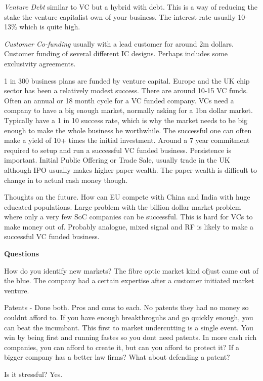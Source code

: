 \textit{Venture Debt} similar to VC but a hybrid with debt. This is a way of reducing the stake the venture capitalist own of your business. The interest rate usually 10-13\% which is quite high.

\textit{Customer Co-funding} usually with a lead customer for around 2m dollars. Customer funding of several different IC designs. Perhaps includes some exclusivity agreements.

1 in 300 business plans are funded by venture capital. Europe and the UK chip sector has been a relatively modest success. There are around 10-15 VC funds. Often an annual or 18 month cycle for a VC funded company. VCs need a company to have a big enough market, normally asking for a 1bn dollar market. Typically have a 1 in 10 success rate, which is why the market needs to be big enough to make the whole business be worthwhile. The successful one can often make a yield of 10+ times the initial investment. Around a 7 year commitment required to setup and run a successful VC funded business. Persistence is important. Initial Public Offering or Trade Sale, usually trade in the UK although IPO usually makes higher paper wealth. The paper wealth is difficult to change in to actual cash money though. 

Thoughts on the future. How can EU compete with China and India with huge educated populations. Large problem with the billion dollar market problem where only a very few SoC companies can be successful. This is hard for VCs to make money out of. Probably analogue, mixed signal and RF is likely to make a successful VC funded business.

\textbf{Questions}

How do you identify new markets? The fibre optic market kind ofjust came out of the blue. The company had a certain expertise after a customer initiated market venture.

Patents - Done both. Pros and cons to each. No patents they had no money so couldnt afford to. If you have enough breakthroguhs and go quickly enough, you can beat the incumbant. This first to market undercutting is a single event. You win by being first and running fastes so you dont need patents. In more cash rich companies, you can afford to create it, but can you afford to protect it? If a bigger company has a better law firms? What about defending a patent? 

Is it stressful? Yes.


\lipsum[2]


\lipsum[3] 

